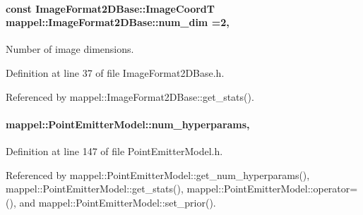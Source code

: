 \paragraph[{\texorpdfstring{num\+\_\+dim}{num_dim}}]{\setlength{\rightskip}{0pt plus 5cm}const {\bf Image\+Format2\+D\+Base\+::\+Image\+CoordT} mappel\+::\+Image\+Format2\+D\+Base\+::num\+\_\+dim =2\hspace{0.3cm}{\ttfamily [static]}, {\ttfamily [inherited]}}\hypertarget{classmappel_1_1ImageFormat2DBase_a9c29fcaf30faffc77b41ba556ebb0127}{}\label{classmappel_1_1ImageFormat2DBase_a9c29fcaf30faffc77b41ba556ebb0127}
Number of image dimensions. 

Definition at line 37 of file Image\+Format2\+D\+Base.\+h.



Referenced by mappel\+::\+Image\+Format2\+D\+Base\+::get\+\_\+stats().

\paragraph[{\texorpdfstring{num\+\_\+hyperparams}{num_hyperparams}}]{ mappel\+::\+Point\+Emitter\+Model\+::num\+\_\+hyperparams\hspace{0.3cm}{\ttfamily [protected]}, {\ttfamily [inherited]}}\hypertarget{classmappel_1_1PointEmitterModel_ab2423214fdd81c8212118770b5b17b1f}{}\label{classmappel_1_1PointEmitterModel_ab2423214fdd81c8212118770b5b17b1f}


Definition at line 147 of file Point\+Emitter\+Model.\+h.



Referenced by mappel\+::\+Point\+Emitter\+Model\+::get\+\_\+num\+\_\+hyperparams(), mappel\+::\+Point\+Emitter\+Model\+::get\+\_\+stats(), mappel\+::\+Point\+Emitter\+Model\+::operator=(), and mappel\+::\+Point\+Emitter\+Model\+::set\+\_\+prior().

